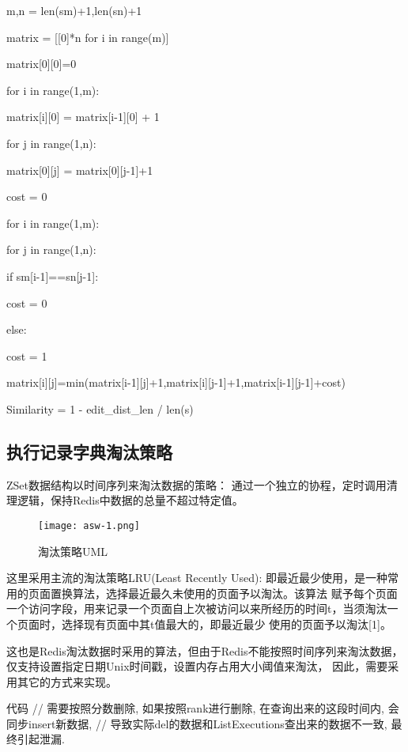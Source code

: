 \begin{algorithm}[h]
    \SetAlgoLined

    m,n = len(sm)+1,len(sn)+1

    matrix = [[0]*n for i in range(m)]

    matrix[0][0]=0

    for i in range(1,m):

    matrix[i][0] = matrix[i-1][0] + 1

    for j in range(1,n):

    matrix[0][j] = matrix[0][j-1]+1

    cost = 0

    for i in range(1,m):

    for j in range(1,n):

    if sm[i-1]==sn[j-1]:

    cost = 0

    else:

    cost = 1

    matrix[i][j]=min(matrix[i-1][j]+1,matrix[i][j-1]+1,matrix[i-1][j-1]+cost)

    Similarity = 1 - edit\_dist\_len / len(s)

\end{algorithm}

\subsection{执行记录字典淘汰策略}
ZSet数据结构以时间序列来淘汰数据的策略： 通过一个独立的协程，定时调用清理逻辑，保持Redis中数据的总量不超过特定值。

\begin{figure}[H]
    \centering
    \texttt{[image: asw-1.png]}
    \caption{淘汰策略UML}
    \label{fig:淘汰策略UML}
\end{figure}

这里采用主流的淘汰策略LRU(Least Recently Used): 即最近最少使用，是一种常用的页面置换算法，选择最近最久未使用的页面予以淘汰。该算法
赋予每个页面一个访问字段，用来记录一个页面自上次被访问以来所经历的时间t，当须淘汰一个页面时，选择现有页面中其t值最大的，即最近最少
使用的页面予以淘汰[1]。

这也是Redis淘汰数据时采用的算法，但由于Redis不能按照时间序列来淘汰数据，仅支持设置指定日期Unix时间戳，设置内存占用大小阈值来淘汰，
因此，需要采用其它的方式来实现。

代码
// 需要按照分数删除, 如果按照rank进行删除, 在查询出来的这段时间内, 会同步insert新数据,
// 导致实际del的数据和ListExecutions查出来的数据不一致, 最终引起泄漏.



